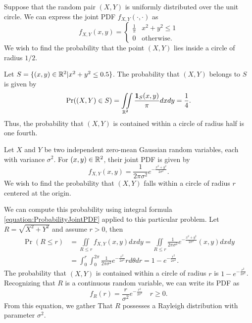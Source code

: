 \begin{example}
Suppose that the random pair $(X, Y)$ is uniformly distributed over the unit circle.
We can express the joint PDF $f_{X,Y} (\cdot, \cdot)$ as
\begin{equation*}
f_{X,Y} (x, y) = \begin{cases} \frac{1}{\pi} & x^2 + y^2 \leq 1 \\
0 & \text{otherwise} . \end{cases}
\end{equation*}
We wish to find the probability that the point $(X, Y)$ lies inside a circle of radius $1/2$.

Let $S = \{ (x, y) \in \mathbb{R}^2 | x^2 + y^2 \leq 0.5 \}$.
The probability that $(X, Y)$ belongs to $S$ is given by
\begin{equation*}
\Pr ((X,Y) \in S)
= \iint\limits_{\mathbb{R}^2}
\frac{\mathbf{1}_{S}(x, y)}{\pi} dx dy
= \frac{1}{4} .
\end{equation*}
Thus, the probability that $(X,Y)$ is contained within a circle of radius half is one fourth.
\end{example}

\begin{example}
Let $X$ and $Y$ be two independent zero-mean Gaussian random variables, each with variance $\sigma^2$.
For $(x, y) \in \mathbb{R}^2$, their joint PDF is given by
\begin{equation*}
f_{X,Y} (x,y) = \frac{1}{2 \pi \sigma^2} e^{- \frac{x^2 + y^2}{2 \sigma^2} } .
\end{equation*}
We wish to find the probability that $(X,Y)$ falls within a circle of radius $r$ centered at the origin.

We can compute this probability using integral formula \eqref{equation:ProbabilityJointPDF} applied to this particular problem.
Let $R = \sqrt{X^2 + Y^2}$ and assume $r > 0$, then
\begin{equation*}
\begin{split}
\Pr (R \leq r) &= \iint\limits_{R \leq r} f_{X,Y} (x,y) dx dy
= \iint\limits_{R \leq r} \frac{1}{2 \pi \sigma^2}
e^{- \frac{ x^2 + y^2 }{2 \sigma^2} } (x,y) dx dy \\
&= \int_0^r \int_0^{2\pi} \frac{1}{2 \pi \sigma^2}
e^{- \frac{ r^2 }{2 \sigma^2} } r d\theta dr
= 1 - e^{- \frac{ r^2 }{2 \sigma^2} } .
\end{split}
\end{equation*}
The probability that $(X, Y)$ is contained within a circle of radius $r$ is $1 - e^{- \frac{ r^2 }{2 \sigma^2} }$.
Recognizing that $R$ is a continuous random variable, we can write its PDF as
\begin{equation*}
f_R (r) = \frac{r}{\sigma^2} e^{- \frac{r^2}{2 \sigma^2} } \quad r \geq 0 .
\end{equation*}
From this equation, we gather That $R$ possesses a Rayleigh distribution with parameter $\sigma^2$.
\end{example}


